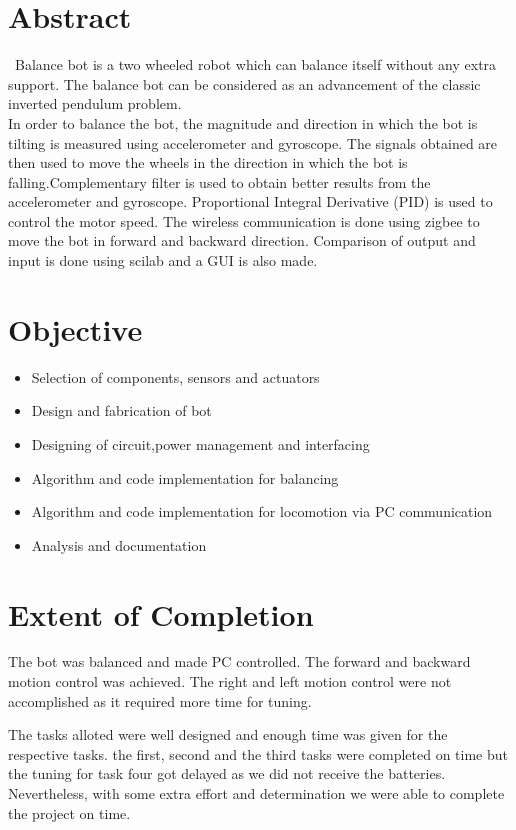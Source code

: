\documentclass[report]{res}
\begin{document}
\large
	
	\section{\large Abstract}
	\ Balance bot is a two wheeled robot which can balance itself without any extra support.
	The balance bot can be considered as an advancement of the  classic inverted pendulum problem.\\
	In order to balance the bot, the magnitude and direction in which  the bot is tilting is measured using accelerometer and gyroscope. The signals obtained are then used to move the wheels in the direction in which the bot is falling.Complementary filter is used to obtain better results from the accelerometer and gyroscope. Proportional Integral Derivative (PID) is used to control the motor speed.
    The wireless communication is done using zigbee to move the bot in forward and backward direction.
    Comparison of output and input is done using scilab and a GUI is also made.
	
	
	
	
	
	\section{\large Objective}
	\begin{itemize}
		\item Selection of components, sensors and actuators 
		\item Design and fabrication of bot
		\item Designing of circuit,power management and interfacing 
		\item Algorithm and code implementation for balancing
		\item Algorithm and code implementation for locomotion via PC communication 
		\item Analysis and documentation 	
	\end{itemize}
	
	\section{\large Extent of Completion}
	 The bot was balanced and made PC controlled.
	 The forward and backward motion control was achieved. The right and left motion  control were not accomplished as it required more time for tuning.
	 
	 
	 The tasks alloted were well designed and enough time was given for the respective tasks.
	 the first, second and the third tasks were completed on time but the tuning for task four got delayed as we did not receive the batteries. Nevertheless, with some extra effort and determination we were able to complete the project on time.
	 
\end{document}
